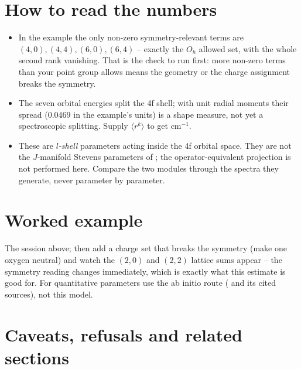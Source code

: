 \section{How to read the numbers}

\begin{readbox}
\begin{itemize}
  \item In the example the only non-zero symmetry-relevant terms are
    $(4,0), (4,4), (6,0), (6,4)$ -- exactly the $O_h$ allowed set, with the
    whole second rank vanishing. That is the check to run first: more non-zero
    terms than your point group allows means the geometry or the charge
    assignment breaks the symmetry.
  \item The seven orbital energies split the 4f shell; with unit radial moments
    their spread ($0.0469$ in the example's units) is a shape measure, not yet
    a spectroscopic splitting. Supply $\langle r^k\rangle$ to get cm$^{-1}$.
  \item These are \emph{$l$-shell} parameters acting inside the 4f orbital
    space. They are not the $J$-manifold Stevens parameters of ; the
    operator-equivalent projection is not performed here. Compare the two
    modules through the spectra they generate, never parameter by parameter.
\end{itemize}
\end{readbox}

\section{Worked example}

The session above; then add a charge set that breaks the symmetry (make one
oxygen neutral) and watch the $(2,0)$ and $(2,2)$ lattice sums appear -- the
symmetry reading changes immediately, which is exactly what this estimate is
good for. For quantitative parameters use the ab initio route
( and its cited sources), not this model.

\section{Caveats, refusals and related sections}

